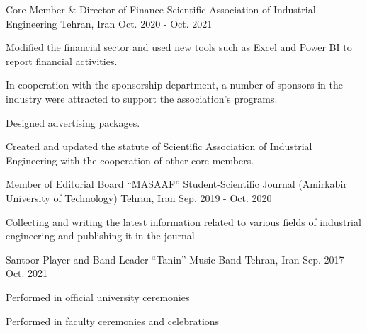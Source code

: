 

\begin{cventries}

  \cventry
    {Core Member \& Director of Finance} %
    {Scientific Association of Industrial Engineering} %
    {Tehran, Iran} %
    {Oct. 2020 - Oct. 2021} %
    {
      \begin{cvitems} %
        \item {Modified the financial sector and used new tools such as Excel and Power BI to report financial activities.}
        \item {In cooperation with the sponsorship department, a number of sponsors in the industry were attracted to support the association's programs.}
        \item {Designed advertising packages.}
        \item {Created and updated the statute of Scientific Association of Industrial Engineering with the cooperation of other core members.}
      \end{cvitems}
    }

  \cventry
    {Member of Editorial Board} %
    {``MASAAF'' Student-Scientific Journal (Amirkabir University of Technology)} %
    {Tehran, Iran} %
    {Sep. 2019 - Oct. 2020} %
    {
      \begin{cvitems} %
    \item{Collecting and writing the latest information related to various fields of industrial engineering and publishing it in the journal.}
      \end{cvitems}
    }

  \cventry
    {Santoor Player and Band Leader} %
    {``Tanin'' Music Band} %
    {Tehran, Iran} %
    {Sep. 2017 - Oct. 2021} %
    {
      \begin{cvitems} %
        \item {Performed in official university ceremonies}
        \item {Performed in faculty ceremonies and celebrations}
      \end{cvitems}
    }
    
\end{cventries}
